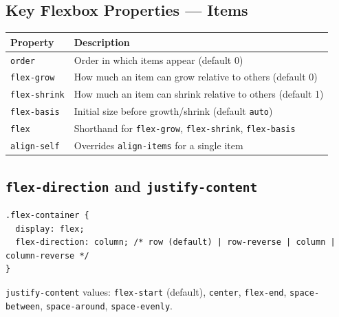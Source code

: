 \documentclass[12pt]{article}
\begin{document}
\subsection{Key Flexbox Properties — Items}
\begin{center}
\begin{tabular}{ll}
\textbf{Property} & \textbf{Description} \\
\hline
\texttt{order} & Order in which items appear (default 0) \\
\texttt{flex-grow} & How much an item can grow relative to others (default 0) \\
\texttt{flex-shrink} & How much an item can shrink relative to others (default 1) \\
\texttt{flex-basis} & Initial size before growth/shrink (default \texttt{auto}) \\
\texttt{flex} & Shorthand for \texttt{flex-grow}, \texttt{flex-shrink}, \texttt{flex-basis} \\
\texttt{align-self} & Overrides \texttt{align-items} for a single item \\
\end{tabular}
\end{center}

\subsection{\texttt{flex-direction} and \texttt{justify-content}}
\begin{lstlisting}
.flex-container {
  display: flex;
  flex-direction: column; /* row (default) | row-reverse | column | column-reverse */
}
\end{lstlisting}
\texttt{justify-content} values: \texttt{flex-start} (default), \texttt{center}, \texttt{flex-end}, \texttt{space-between}, \texttt{space-around}, \texttt{space-evenly}.
\end{document}
